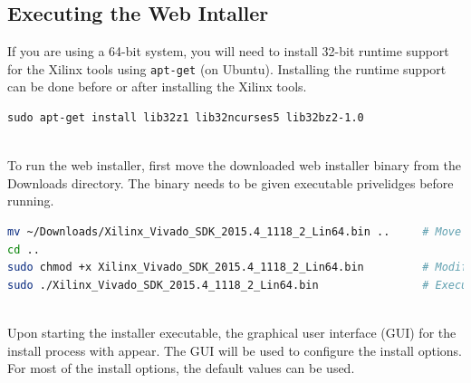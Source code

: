 \subsection{Executing the Web Intaller}
\noindent
If you are using a 64-bit system, you will need to install 32-bit runtime support for the Xilinx tools using \texttt{apt-get} (on Ubuntu). Installing the runtime support can be done before or after installing the Xilinx tools. \\

\begin{lstlisting}
sudo apt-get install lib32z1 lib32ncurses5 lib32bz2-1.0
\end{lstlisting}


~\\
\noindent
To run the web installer, first move the downloaded web installer binary from the Downloads directory. The binary needs to be given executable privelidges before running. \\

\begin{fullwidth}
\begin{lstlisting}[language=bash]
mv ~/Downloads/Xilinx_Vivado_SDK_2015.4_1118_2_Lin64.bin ..     # Move installer to home directory
cd ..                                                           
sudo chmod +x Xilinx_Vivado_SDK_2015.4_1118_2_Lin64.bin         # Modify binary permissions
sudo ./Xilinx_Vivado_SDK_2015.4_1118_2_Lin64.bin                # Execute binary
\end{lstlisting}
\end{fullwidth}


~\\
\noindent
Upon starting the installer executable, the graphical user interface (GUI) for the install process with appear. The GUI will be used to configure the install options. For most of the install options, the default values can be used. \\

